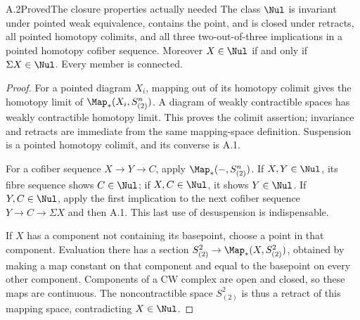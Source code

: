 \begin{claim}{A.2}{Proved}{The closure properties actually needed}\label{A2}
The class $\Nul$ is invariant under pointed weak equivalence, contains the point, and is closed under retracts, all pointed homotopy colimits, and all three two-out-of-three implications in a pointed homotopy cofiber sequence. Moreover $X\in\Nul$ if and only if $\Sigma X\in\Nul$. Every member is connected.
\end{claim}
\begin{proof}
For a pointed diagram $X_i$, mapping out of its homotopy colimit gives the homotopy limit of $\Map_*(X_i,S^n_{(2)})$. A diagram of weakly contractible spaces has weakly contractible homotopy limit. This proves the colimit assertion; invariance and retracts are immediate from the same mapping-space definition. Suspension is a pointed homotopy colimit, and its converse is A.1.

For a cofiber sequence $X\to Y\to C$, apply $\Map_*(-,S^n_{(2)})$. If $X,Y\in\Nul$, its fibre sequence shows $C\in\Nul$; if $X,C\in\Nul$, it shows $Y\in\Nul$. If $Y,C\in\Nul$, apply the first implication to the next cofiber sequence $Y\to C\to\Sigma X$ and then A.1. This last use of desuspension is indispensable.

If $X$ has a component not containing its basepoint, choose a point in that component. Evaluation there has a section $S^2_{(2)}\to\Map_*(X,S^2_{(2)})$, obtained by making a map constant on that component and equal to the basepoint on every other component. Components of a CW complex are open and closed, so these maps are continuous. The noncontractible space $S^2_{(2)}$ is thus a retract of this mapping space, contradicting $X\in\Nul$.
\end{proof}


